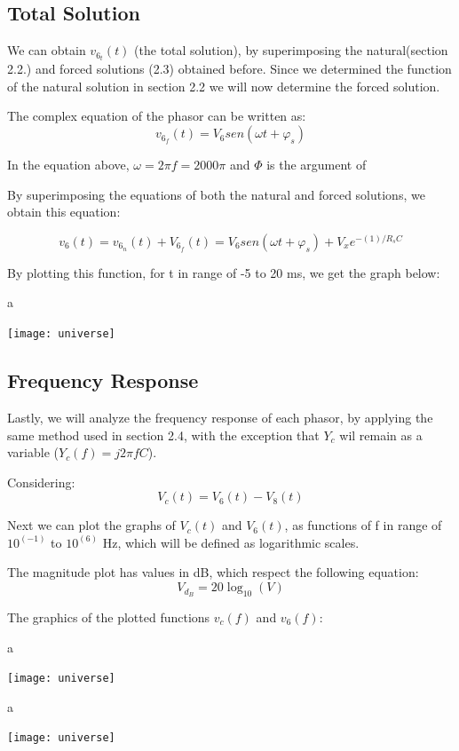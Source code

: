 \subsection{Total Solution}
We can obtain $v_6_t(t)$ (the total solution), by superimposing the natural(section 2.2.) and forced solutions (2.3) obtained before. Since we determined the function of the natural solution in section 2.2 we will now determine the forced solution.

The complex equation of the phasor can be written as:
\begin{equation}
	v_6_f(t) = V_6sen(\omega t + \varphi_s)
\end{equation}

In the equation above, $\omega = 2\pi f = 2000\pi$ and $\varPhi$ is the argument of 

By superimposing the equations of both the natural and forced solutions, we obtain this equation:

\begin{equation}
	v_6(t) = v_6_n(t) + V_6_f(t) = V_6sen(\omega t + \varphi_s) + V_xe^{-(1)/R_sC}
\end{equation}

By plotting this function, for t in range of -5 to 20 ms, we get the graph below:


\graphicspath{ {./images/} }

a

\texttt{[image: universe]}

\subsection{Frequency Response}

Lastly, we will analyze the frequency response of each phasor, by applying the same method used in section 2.4, with the exception that $Y_c$ wil remain as a variable ($Y_c(f) = j2\pi fC$).

Considering:
\begin{equation}
	V_c(t) = V_6(t) - V_8(t)
\end{equation} 

Next we can plot the graphs of $V_c(t)$ and $V_6(t)$, as functions of f in range of $10^(-1)$ to $10^(6)$ Hz, which will be defined as logarithmic scales.

The magnitude plot has values in dB, which respect the following equation:
\begin{equation}
	V_d_B = 20\log_10(V)
\end{equation}

The graphics of the plotted functions $v_c(f)$ and $v_6(f)$:


\graphicspath{ {./images/} }

a

\texttt{[image: universe]}



\graphicspath{ {./images/} }

a

\texttt{[image: universe]}
